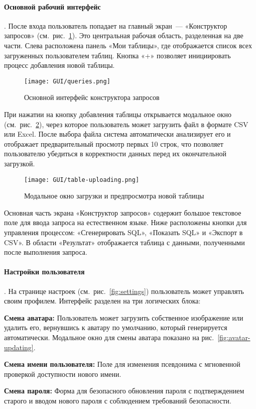 \paragraph{Основной рабочий интерфейс}. После входа пользователь попадает на главный экран~---
«Конструктор запросов» (см.~рис.~\ref{fig:queries}). Это центральная рабочая область, разделенная на
две части. Слева расположена панель «Мои таблицы», где отображается список всех загруженных
пользователем таблиц. Кнопка «+» позволяет инициировать процесс добавления новой таблицы.

\begin{figure}[ht]
      \centering
      \texttt{[image: GUI/queries.png]}
      \caption{Основной интерфейс конструктора запросов}
      \label{fig:queries}
\end{figure}

При нажатии на кнопку добавления таблицы открывается модальное окно
(см.~рис.~\ref{fig:table-uploading}), через которое пользователь может загрузить файл в формате CSV
или Excel. После выбора файла система автоматически анализирует его и отображает предварительный
просмотр первых 10 строк, что позволяет пользователю убедиться в корректности данных перед их
окончательной загрузкой.

\begin{figure}[ht]
      \centering
      \texttt{[image: GUI/table-uploading.png]}
      \caption{Модальное окно загрузки и предпросмотра новой таблицы}
      \label{fig:table-uploading}
\end{figure}

Основная часть экрана «Конструктор запросов» содержит большое текстовое поле для ввода запроса на
естественном языке. Ниже расположены кнопки для управления процессом: «Сгенерировать SQL», «Показать
SQL» и «Экспорт в CSV». В области «Результат» отображается таблица с данными, полученными после
выполнения запроса.

\paragraph{Настройки пользователя}. На странице настроек (см.~рис.~\ref{fig:settings}) пользователь
может управлять своим профилем.
Интерфейс разделен на три логических блока:
\begin{compactitem}
      \item \textbf{Смена аватара:} Пользователь может загрузить собственное изображение или удалить
      его, вернувшись к аватару по умолчанию, который генерируется автоматически. Модальное окно для
      смены аватара показано на рис.~\ref{fig:avatar-updating}.
      \item \textbf{Смена имени пользователя:} Поле для изменения псевдонима с мгновенной проверкой
      доступности нового имени.
      \item \textbf{Смена пароля:} Форма для безопасного обновления пароля с подтверждением старого и
      вводом нового пароля с соблюдением требований безопасности.
\end{compactitem}

